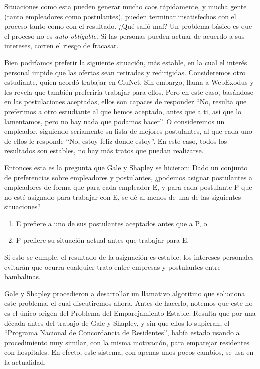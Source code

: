 \documentclass[a4paper, 12pt]{book}
\theoremstyle{dotless}
\begin{document}
Situaciones como esta pueden generar mucho caos rápidamente, y mucha gente (tanto empleadores como postulantes), pueden terminar insatisfechos con el proceso tanto como con el resultado. ¿Qué salió mal? Un problema básico es que el proceso no es \textit{auto-obligable}. Si las personas pueden actuar de acuerdo a sus intereses, corren el riesgo de fracasar.

Bien podríamos preferir la siguiente situación, más estable, en la cual el interés personal impide que las ofertas sean retiradas y redirigidas. Consideremos otro estudiante, quien acordó trabajar en CluNet. Sin embargo, llama a WebExodus y les revela que también preferiría trabajar para ellos.	Pero en este caso, basándose en las postulaciones aceptadas, ellos son capaces de responder ``No, resulta que preferimos a otro estudiante al que hemos aceptado, antes que a ti, así que lo lamentamos, pero no hay nada que podamos hacer''. O consideremos un empleador, siguiendo seriamente su lista de mejores postulantes, al que cada uno de ellos le responde ``No, estoy feliz donde estoy''. En este caso, todos los resultados son estables, no hay más tratos que puedan realizarse.

Entonces esta es la pregunta que Gale y Shapley se hicieron: Dado un conjunto de preferencias sobre empleadores y postulantes, ¿podemos asignar postulantes a empleadores de forma que para cada empleador E, y para cada postulante P que no esté asignado para trabajar con E, se dé al menos de una de las siguientes situaciones?

\begin{enumerate}
   \item E prefiere a uno de sus postulantes aceptados antes que a P, o
   \item P prefiere su situación actual antes que trabajar para E.
\end{enumerate}

Si esto se cumple, el resultado de la asignación es estable: los intereses personales evitarán que ocurra cualquier trato entre empresas y postulantes entre bambalinas.
	
Gale y Shapley procedieron a desarrollar un llamativo algoritmo que soluciona este problema, el cual discutiremos ahora. Antes de hacerlo, notemos que este no es el único origen del Problema del Emparejamiento Estable. Resulta que por una década antes del trabajo de Gale y Shapley, y sin que ellos lo supieran, el ``Programa Nacional de Concordancia de Residentes'', había estado usando a procedimiento muy similar, con la misma motivación, para emparejar residentes con hospitales. En efecto, este sistema, con apenas unos pocos cambios, se usa en la actualidad.
\end{document}
